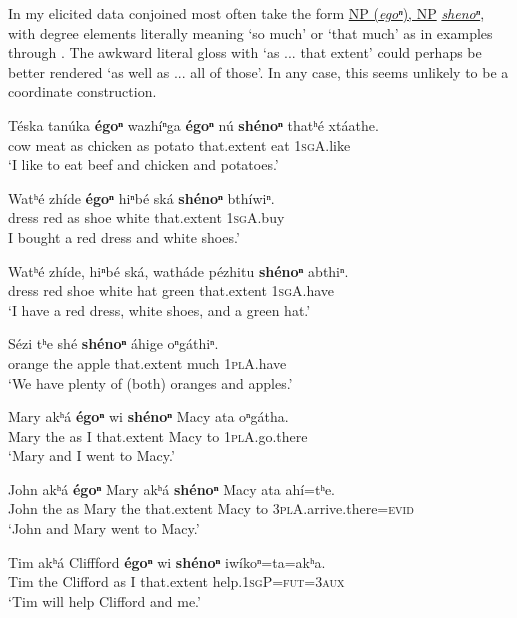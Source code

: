 \documentclass[output=paper]{LSP/langsci}
\begin{document}
In my elicited data conjoined  most often take the form \underline{NP (\textit{egoⁿ}), NP} \underline{\textit{shenoⁿ}}, with degree elements literally meaning `so much' or `that much' as in examples  through . The awkward literal gloss with `as ... that extent' could perhaps be better rendered `as well as ... all of those'. In any case, this seems unlikely to be a coordinate construction.

\begin{exe}
\ex\label{ex:rudin:18}
\gll Téska 	tanúka 	\textbf{égoⁿ} 	wazhíⁿga 	\textbf{égoⁿ}	nú \textbf{shénoⁿ} thatʰé  xtáathe.\\
	cow   	meat    	as     	chicken   	as     	potato 	that.extent 	eat      	\textsc{1sgA}.like\\
\trans `I like to eat beef and chicken and potatoes.'    
 
 \ex\label{ex:rudin:19}
\gll Watʰé 	zhíde 	\textbf{égoⁿ} 	hiⁿbé 	ská    \textbf{	shénoⁿ}  	bthíwiⁿ.\\
	dress   	red  	as   	shoe 	white 	that.extent 	\textsc{1sgA}.buy\\
\trans I bought a red dress and white shoes.'  

\ex\label{ex:rudin:20}
\gll Watʰé  zhíde,  hiⁿbé	ská,  watháde  pézhitu \textbf{shénoⁿ} abthiⁿ.\\ 
dress   	red   	shoe 	white 	hat  	green 	that.extent 	\textsc{1sgA}.have \\
\trans `I have a red dress, white shoes, and a green hat.'   

\ex\label{ex:rudin:21}
\gll Sézi  	tʰe 	shé  	\textbf{shénoⁿ} 	áhige 	oⁿgáthiⁿ. \\
	orange 	the 	apple 	that.extent 	much  	\textsc{1plA}.have \\
\trans `We have plenty of (both) oranges and apples.'

\ex\label{ex:rudin:22}
\gll Mary akʰá  	\textbf{égoⁿ} wi \textbf{shénoⁿ} Macy ata oⁿgátha. \\
 Mary	the  as  	I 	that.extent  	Macy to 	\textsc{1plA}.go.there \\
\trans `Mary and I went to Macy.'

\ex\label{ex:rudin:23}
\gll John akʰá \textbf{égoⁿ} Mary akʰá \textbf{shénoⁿ} Macy ata ahí=tʰe. \\
 John the 	as  Mary the 	that.extent  Macy to \textsc{3plA}.arrive.there=\textsc{evid} \\
\trans `John and Mary went to Macy.'
 
\ex\label{ex:rudin:24} 
\gll Tim akʰá Cliffford \textbf{égoⁿ} wi \textbf{shénoⁿ} iwíkoⁿ=ta=akʰa. \\
Tim the Clifford as 	I  that.extent  help.\textsc{1sgP}=\textsc{fut=3aux} \\
\trans `Tim will help Clifford and me.'
\end{exe}
\end{document}
